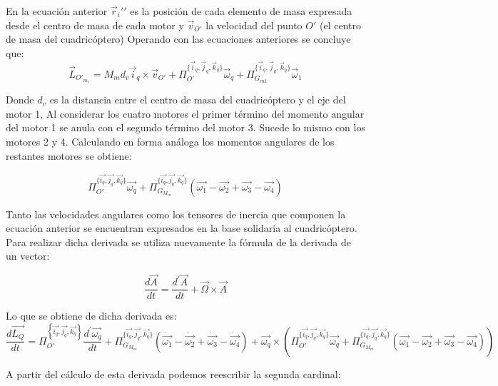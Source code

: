\documentclass[main]{subfiles}
\begin{document}
En la ecuaci\'on anterior $\vec{r}_i\prime\prime$ es la posici\'on de cada elemento de masa expresada desde el centro de masa de cada motor y $\vec{v}_{O\prime}$ la velocidad del punto $O\prime$ (el centro de masa del cuadric\'optero) Operando con las ecuaciones anteriores se concluye que:
\begin{equation}
\vec{L}_{O\prime_{m_1}} = M_m d_v\vec{i}_q\times \vec{v}_{O\prime} +\Pi_{O\prime}^{\{\vec{i}_q, \vec{j}_q, \vec{k}_q\}}\vec{\omega}_q+ \Pi_{G_{m1}}^{\{\vec{i}_q, \vec{j}_q, \vec{k}_q\}}\vec{\omega}_1
\end{equation}

Donde $d_v$ es la distancia entre el centro de masa del cuadric\'optero y el eje del motor 1, Al considerar los cuatro motores el primer t\'ermino del momento angular del motor 1 se anula con el segundo t\'ermino del motor 3. Sucede lo mismo con los motores 2 y 4.
Calculando en forma an\'aloga los momentos angulares de los restantes motores se obtiene:

\begin{equation}
\Pi_{O\prime}^{\{\vec{i_q}, \vec{j_q}, \vec{k_q}\}}\vec{\omega_q}+\Pi_{G_{M_{m}}}^{\{\vec{i_q}, \vec{j_q}, \vec{k_q}\}}(\vec{\omega_1}-\vec{\omega_2}+\vec{\omega_3}-\vec{\omega_4})
\end{equation}

Tanto las velocidades angulares como los tensores de inercia que componen la ecuaci\'on anterior se encuentran expresados en la base solidaria al cuadric\'optero. Para realizar dicha derivada se utiliza nuevamente la f\'ormula de la derivada de un vector:

\begin{equation}
\frac{d\vec{A}}{dt} =\frac{d^\prime\vec{A}}{dt}+\vec{\Omega}\times\vec{A} 
\end{equation}

Lo que se obtiene de dicha derivada es:
\begin{equation}
\frac{d\vec{L_Q}}{dt} = \Pi_{O\prime}^{\left\lbrace\vec{i_q}, \vec{j_q}, \vec{k_q}\right\rbrace}\frac{d^\prime\vec{{\omega}_q}}{dt}+\Pi_{G_{M_{m}}}^{\{\vec{i_q}, \vec{j_q}, \vec{k_q}\}}(\dot{\vec{\omega_1}}-\dot{\vec{\omega_2}}+\dot{\vec{\omega_3}}-\dot{\vec{\omega_4}})
+\vec{\omega_q}\times(\Pi_{O\prime}^{\{\vec{i_q}, \vec{j_q}, \vec{k_q}\}}\vec{\omega_q}+\Pi_{G_{M_{m}}}^{\{\vec{i_q}, \vec{j_q}, \vec{k_q}\}}(\vec{\omega_1}-\vec{\omega_2}+\vec{\omega_3}-\vec{\omega_4}))
\end{equation}

A partir del c\'alculo de esta derivada podemos reescribir la segunda cardinal:
\end{document}
